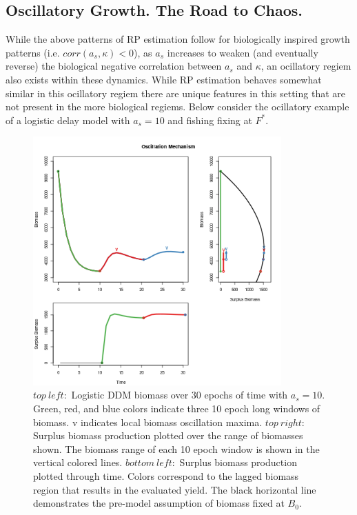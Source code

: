 \subsection{Oscillatory Growth. The Road to Chaos.\label{oscillation}}

%
While the above patterns of RP estimation follow for biologically inspired 
growth patterns (i.e. $corr(a_s, \kappa)<0$),
as $a_s$ increases to weaken (and eventually reverse) the biological negative 
correlation between $a_s$ and $\kappa$, an ocillatory regiem also exists within these dynamics. 
While RP estimation behaves somewhat similar in this ocillatory regiem there 
are unique features in this setting that are not present in the more biological 
regiems. Below consider the ocillatory example of a logistic delay model with 
$a_s=10$ and fishing fixing at $F^*$.

\begin{figure}[h!]
\centering
\includegraphics[width=0.85\textwidth]{../ddBias/shockBiomassSurplus.png}%
\vspace{-0.5cm}
\caption{$top~left:$ Logistic DDM biomass over 30 epochs of time with $a_s=10$.
Green, red, and blue colors indicate three 10 epoch long windows of biomass.
v indicates local biomass oscillation maxima.
$top~right:$ %
Surplus biomass production plotted over the range of biomasses shown.
The biomass range of each 10 epoch window is shown in the vertical colored lines.
$bottom~left:$ %
Surplus biomass production plotted through time. Colors correspond to the
lagged biomass region that results in the evaluated yield. The black horizontal
line demonstrates the pre-model assumption of biomass fixed at $B_0$.
}
\label{shock}
\end{figure}

